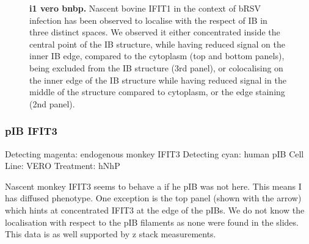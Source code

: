 \begin{figure}
\begin{subfigure}{1\textwidth}
    \end{subfigure}
    \caption[i1 vero bnbp]{\textbf{i1 vero bnbp.} Nascent bovine IFIT1 in the context of bRSV infection has been observed to localise with the respect of IB in three distinct spaces. We observed it either concentrated inside the central point of the IB structure, while having reduced signal on the inner IB edge, compared to the cytoplasm (top and bottom panels), being excluded from the IB structure (3rd panel), or colocalising on the inner edge of the IB structure while having reduced signal in the middle of the structure compared to cytoplasm, or the edge staining (2nd panel).}
    \label{fig:i1 vero bnbp}
\end{figure}

\subsubsection{pIB IFIT3}
Detecting magenta: endogenous monkey IFIT3 \newline
Detecting cyan: human pIB \newline
Cell Line: VERO \newline
Treatment: hNhP \newline

Nascent monkey IFIT3 seems to behave a if he pIB was not here. This means I has diffused phenotype. One exception is the top panel (shown with the arrow) which hints at concentrated IFIT3 at the edge of the pIBs. We do not know the localisation with respect to the pIB filaments as none were found in the slides. This data is as well supported by z stack measurements.

